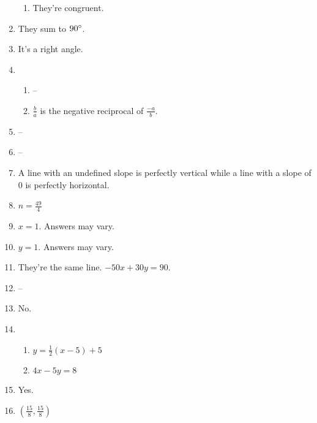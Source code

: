 \documentclass{article}
\begin{document}
\begin{enumerate}
\begin{enumerate}
	\item They're congruent.
	
	\end{enumerate}

\item They sum to $90\degree$.

\item It's a right angle.

\item

	\begin{enumerate}
	
	\item --
	
	\item $\frac{b}{a}$ is the negative reciprocal of $\frac{-a}{b}$.
	
	\end{enumerate}
	
\item --

\item --

\item A line with an undefined slope is perfectly vertical while a line with a slope of 0 is perfectly horizontal.

\item $n = \frac{49}{4}$

\item $x = 1$. Answers may vary.

\item $y = 1$. Answers may vary. 

\item They're the same line. $-50x + 30y = 90$. 

\item --

\item No.

\item

	\begin{enumerate}
	
	\item $y = \frac{1}{2} (x - 5) + 5$
	
	\item $4x - 5y = 8$
	
	\end{enumerate}
	
\item Yes.

\item $\left( \frac{15}{8}, \frac{15}{8} \right)$


\end{enumerate}
\end{document}
